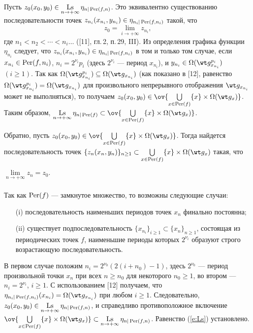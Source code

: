 \begin{pf}
Пусть $z_0(x_0, y_0)\in\Ls\limits_{n\to +\infty}
\eta_{n|\Per(f, n)}$.
Это эквивалентно существованию последовательности точек
$z_{n_i}(x_{n_i}, y_{n_i})\in\eta_{n_i|\operatorname{Per}(f, n_i)}$
такой, что
$$
z_0=\lim\limits_{i\to +\infty} z_{n_i},
$$
где $n_1 < n_2 <\dotsb < n_i\ldots$ 
([11], гл.\,2, п.\,29, III).
Из определения графика функции $\eta_{n_i}$ следует, что
$z_{n_i}(x_{n_i}, y_{n_i})\in\eta_{n_i|\operatorname{Per}(f, n_i)}$
в том и только том случае, если
$x_{n_i}\in \operatorname{Per}(f, n_i)$, $n_i=2^{\nu_i}p_i$
(здесь $2^{\nu_i}$ --- период $x_{n_i}$), и
$y_{n_i}\in\Om(\wt g_{x_{n_i}}^{p_i})$ $(i\geq 1)$.
Так как
$\Om(\wt g_{x_{n_i}}^{p_i})\subseteq
\Om(\wt g_{x_{n_i}})$ (как показано в [12], равенство
$\Om(\wt g_{x_{n_i}}^{p_i})=
\Om(\wt g_{x_{n_i}})$ для произвольного непрерывного отображения
$\wt g_{x_{n_i}}$ может не выполняться),
то получаем $z_0(x_0, y_0)\in
\ov{\bigcup\limits_{x\in \Per(f)}\{x\}\times\Om(\wt g_x)}$.
Таким образом,
$\Ls\limits_{n\to +\infty}\eta_{n|
\Per(f)}\subset \ov{\bigcup\limits_{x\in \Per(f)}\{x\}\times\Om(\wt g_x)}$.

Обратно, пусть $z_0(x_0, y_0)\in
\ov{\bigcup\limits_{x\in \Per(f)}\{x\}\times\Om(\wt g_x)}$.
Тогда найдется последовательность точек
$\{z_n(x_n, y_n)\}_{n\geq 1}\subset
\bigcup\limits_{x\in \Per(f)}\{x\}\times\Om(\wt g_x)$
такая, что
$\lim\limits_{n\to +\infty}z_n=z_0$. $\phantom{\int\limits^{1^1}_{1_1}}$

Так как $\operatorname{Per}(f)$ --- замкнутое множество, то возможны следующие случаи:
\begin{itemize}
\item[(i)] последовательность наименьших периодов точек
$x_n$ финально постоянна;
\item[(ii)] существует подпоследовательность
$\{x_{n_i}\}_{i\geq 1}\subset\{x_n\}_{n\geq 1}$,
состоящая из периодических точек $f$, наименьшие
периоды которых $2^{\nu_i}$ образуют строго возрастающую последовательность.
\end{itemize}

В первом случае положим $n_i=2^{\nu_0}(2(i+ n_0)-1)$, здесь
$2^{\nu_0}$ --- период произвольной точки $x_n$ при всех
$n\geq n_0$ для некоторого $n_0\geq 1$,
во втором ---
$n_i=2^{\nu_i}$, $i\geq 1$. С использованием [12] получаем, что 
$\eta_{n_i| \Per(f, n_i)}(x_{n_i})=\Om(\wt g_{x_{n_i}})$ при любом $i\geq 1$.
Следовательно,
$z_0(x_0, y_0)\in\Ls\limits_{n\to +\infty}
\eta_{n| \Per(f, n)}$, и справедливо противоположное включение
$\ov{\bigcup\limits_{x\in \Per(f)}\{x\}\times\Om(\wt g_x)}
\subset\Ls\limits_{n\to +\infty}\eta_{n| \Per(f, n)}$.
Равенство (\ref{e:Ls}) установлено.
\end{pf}


